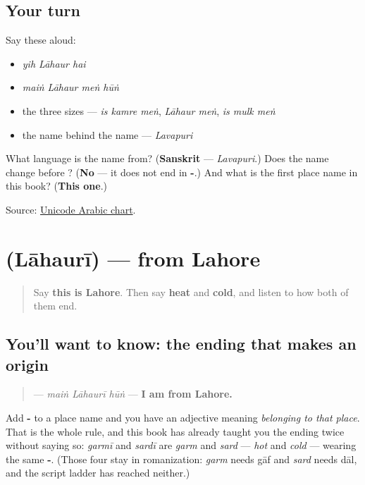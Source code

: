 \subsection*{Your turn}
Say these aloud:

\begin{itemize}
\raggedright
  \item \emph{yih Lāhaur hai}
  \item \emph{maiṅ Lāhaur meṅ hūṅ}
  \item the three sizes — \emph{is kamre meṅ}, \emph{Lāhaur meṅ}, \emph{is mulk meṅ}
  \item the name behind the name — \emph{Lavapuri}
\end{itemize}

\begin{tcolorbox}[breakable,colback=teal!4,colframe=teal!35!black,title={Before you move on}]
What language is the name \textbf{} from? (\textbf{Sanskrit} — \emph{Lavapuri}.) Does the name change before \textbf{}? (\textbf{No} — it does not end in \textbf{-}.) And what is the first place name in this book? (\textbf{This one}.)

Source: \href{https://www.unicode.org/charts/PDF/U0600.pdf}{Unicode Arabic chart}.
\end{tcolorbox}
\section[\texorpdfstring{\ur{لاہوری} (Lāhaurī)}{لاہوری (Lāhaurī)}]{ (Lāhaurī) — from Lahore}

\label{lesson:UR-C27-lahori}



\begin{quote}
Say \textbf{this is Lahore}. Then say \textbf{heat} and \textbf{cold}, and listen to how both of them end.
\end{quote}

\subsection*{You'll want to know: the ending that makes an origin}
\begin{quote}
\textbf{  } — \emph{maiṅ Lāhaurī hūṅ} — \textbf{I am from Lahore.}
\end{quote}

Add \textbf{-} to a place name and you have an adjective meaning \emph{belonging to that place}. That is the whole rule, and this book has already taught you the ending twice without saying so: \emph{garmī} and \emph{sardī} are \emph{garm} and \emph{sard} — \emph{hot} and \emph{cold} — wearing the same \textbf{-}. (Those four stay in romanization: \emph{garm} needs gāf and \emph{sard} needs dāl, and the script ladder has reached neither.)

